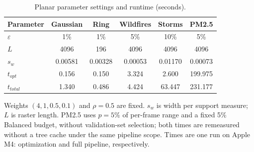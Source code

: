\begin{table}[!ht]
\centering
\caption{Planar parameter settings and runtime (seconds).}
\label{tab:anchor-parameters-final}
\footnotesize
\setlength{\tabcolsep}{2pt}
\renewcommand{\arraystretch}{0.95}
\begin{tabular}{@{}lccccc@{}}
\toprule
Parameter & Gaussian & Ring & Wildfires & Storms & PM2.5 \\
\midrule
$\varepsilon$ & 1\% & 1\% & 5\% & 10\% & 5\% \\
$L$ & 4096 & 196 & 4096 & 4096 & 4096 \\
$s_w$ & 0.00581 & 0.00328 & 0.00053 & 0.01170 & 0.00073 \\
$t_{opt}$ & 0.156 & 0.150 & 3.324 & 2.600 & 199.975 \\
$t_{total}$ & 1.340 & 0.486 & 4.424 & 63.447 & 231.177 \\
\bottomrule
\end{tabular}
\vspace{2pt}
\begin{minipage}{0.94\columnwidth}\footnotesize Weights $(4,1,0.5,0.1)$ and $\rho=0.5$ are fixed. $s_w$ is width per support measure; $L$ is raster length. PM2.5 uses $p=5\%$ of per-frame range and a fixed 5\% Balanced budget, without validation-set selection; both times are remeasured without a tree cache under the same pipeline scope. Times are one run on Apple M4: optimization and full pipeline, respectively.\end{minipage}
\end{table}
